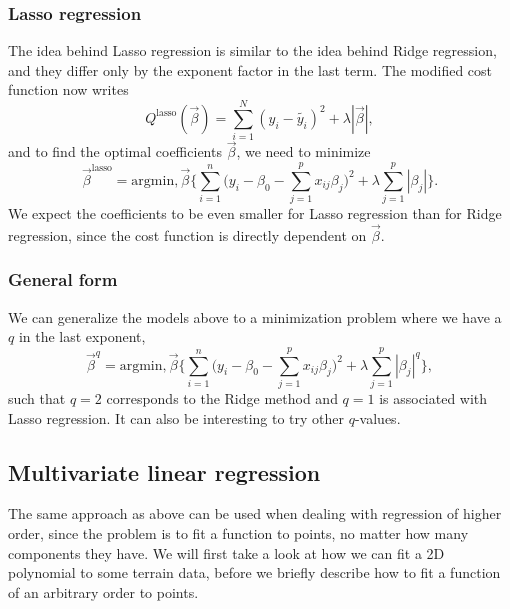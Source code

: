 \subsubsection{Lasso regression} \label{sec:lasso}
The idea behind Lasso regression is similar to the idea behind Ridge regression, and they differ only by the exponent factor in the last term. The modified cost function now writes
\begin{equation}
Q^{\text{lasso}}(\vec{\beta})=\sum_{i=1}^N(y_i-\tilde{y_i})^2+\lambda|\vec{\beta}|,
\end{equation}
and to find the optimal coefficients $\vec{\beta}$, we need to minimize
\begin{equation}
\vec{\beta}^{\text{lasso}}=\text{argmin},\vec{\beta}\bigg\{\sum_{i=1}^{n}\Big(y_i-\beta_0-\sum_{j=1}^px_{ij}\beta_j\Big)^2+\lambda\sum_{j=1}^p|\beta_j|\bigg\}.
\end{equation}
We expect the coefficients to be even smaller for Lasso regression than for Ridge regression, since the cost function is directly dependent on $\vec{\beta}$.

\subsubsection{General form} \label{sec:general}
We can generalize the models above to a minimization problem where we have a $q$ in the last exponent, 
\begin{equation}
\vec{\beta}^q=\text{argmin},\vec{\beta}\bigg\{\sum_{i=1}^{n}\Big(y_i-\beta_0-\sum_{j=1}^px_{ij}\beta_j\Big)^2+\lambda\sum_{j=1}^p|\beta_j|^q\bigg\},
\end{equation}
such that $q=2$ corresponds to the Ridge method and $q=1$ is associated with Lasso regression. It can also be interesting to try other $q$-values.

\subsection{Multivariate linear regression} \label{sec:higher_reg}
The same approach as above can be used when dealing with regression of higher order, since the problem is to fit a function to points, no matter how many components they have. We will first take a look at how we can fit a 2D polynomial to some terrain data, before we briefly describe how to fit a function of an arbitrary order to points.

